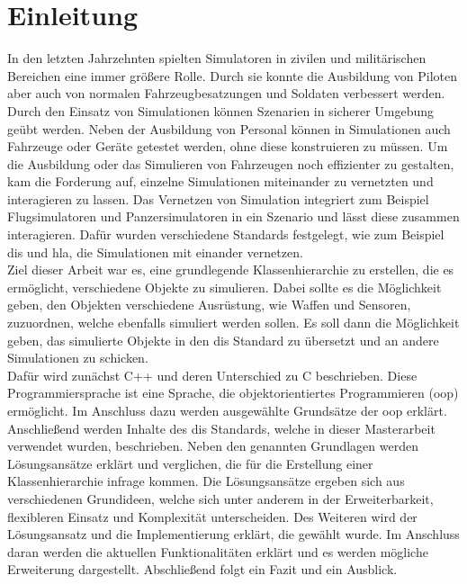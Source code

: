 \chapter{Einleitung}\label{Einleitung}
\onehalfspacing
In den letzten Jahrzehnten spielten Simulatoren in zivilen und militärischen Bereichen eine immer größere Rolle. Durch sie konnte die Ausbildung von Piloten aber auch von normalen Fahrzeugbesatzungen und Soldaten verbessert werden. Durch den Einsatz von Simulationen können Szenarien in sicherer Umgebung geübt werden. Neben der Ausbildung von Personal können in Simulationen auch Fahrzeuge oder Geräte getestet werden, ohne diese konstruieren zu müssen. 
Um die Ausbildung oder das Simulieren von Fahrzeugen noch effizienter zu gestalten, kam die Forderung auf, einzelne Simulationen miteinander zu vernetzten und interagieren zu lassen. Das Vernetzen von Simulation integriert zum Beispiel Flugsimulatoren und Panzersimulatoren in ein Szenario und lässt diese zusammen interagieren. 
Dafür wurden verschiedene Standards festgelegt, wie zum Beispiel \ac{dis} und \ac{hla}, die Simulationen mit einander vernetzen.\\ Ziel dieser Arbeit war es, eine grundlegende Klassenhierarchie zu erstellen, die es ermöglicht, verschiedene Objekte zu simulieren. Dabei sollte es die Möglichkeit geben, den Objekten verschiedene Ausrüstung, wie Waffen und Sensoren, zuzuordnen, welche ebenfalls simuliert werden sollen. Es soll dann die Möglichkeit geben, das simulierte Objekte in den \ac{dis} Standard zu übersetzt und an andere Simulationen zu schicken.  \\
Dafür wird zunächst C++ und deren Unterschied zu C beschrieben. Diese Programmiersprache ist eine Sprache, die objektorientiertes Programmieren (\acs{oop}) ermöglicht. Im Anschluss dazu werden ausgewählte Grundsätze der \acs{oop} erklärt. Anschließend werden Inhalte des \ac{dis} Standards, welche in dieser Masterarbeit verwendet wurden, beschrieben. Neben den genannten Grundlagen werden Lösungsansätze erklärt und verglichen, die für die Erstellung einer Klassenhierarchie infrage kommen. Die Lösungsansätze ergeben sich aus verschiedenen Grundideen, welche sich unter anderem in der Erweiterbarkeit, flexibleren Einsatz und Komplexität unterscheiden.   Des Weiteren wird der Lösungsansatz und die Implementierung  erklärt, die gewählt wurde. Im Anschluss daran werden die aktuellen Funktionalitäten erklärt und es werden mögliche Erweiterung dargestellt. Abschließend folgt ein Fazit und ein Ausblick.  
       